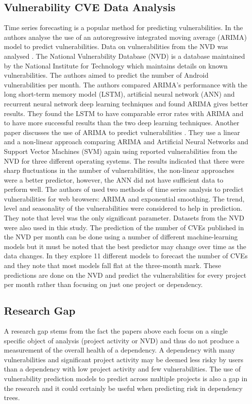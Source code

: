 \documentclass[conference]{IEEEtran}
\begin{document}
\subsection{Vulnerability CVE Data Analysis}
Time series forecasting is a popular method for predicting vulnerabilities. In \cite{gencer_time_2021} the authors analyse the use of an autoregressive integrated moving average (ARIMA) model to predict vulnerabilities. Data on vulnerabilities from the NVD was analysed \cite{noauthor_vulnerability_nodate}. The National Vulnerability Database (NVD) is a database maintained by the National Institute for Technology which maintains details on known vulnerabilities. The authors aimed to predict the number of Android vulnerabilities per month. The authors compared ARIMA's performance with the long short-term memory model (LSTM), artificial neural network (ANN) and recurrent neural network deep learning techniques and found ARIMA gives better results. They found the LSTM to have comparable error rates with ARIMA and to have more successful results than the two deep learning techniques. Another paper discusses the use of ARIMA to predict vulnerabilities \cite{pokhrel_cybersecurity_2017}. They use a linear and a non-linear approach comparing ARIMA and Artificial Neural Networks and Support Vector Machines (SVM) again using reported vulnerabilities from the NVD for three different operating systems. The results indicated that there were sharp fluctuations in the number of vulnerabilities, the non-linear approaches were a better predictor, however, the ANN did not have sufficient data to perform well. The authors of \cite{roumani_time_2015} used two methods of time series analysis to predict vulnerabilities for web browsers: ARIMA and exponential smoothing. The trend, level and seasonality of the vulnerabilities were considered to help in prediction. They note that level was the only significant parameter. Datasets from the NVD were also used in this study. The prediction of the number of CVEs published in the NVD per month can be done using a number of different machine-learning models but it must be noted that the best predictor may change over time as the data changes. In \cite{leverett_vulnerability_2021} they explore 11 different models to forecast the number of CVEs and they note that most models fall flat at the three-month mark. These predictions are done on the NVD and predict the vulnerabilities for every project per month rather than focusing on just one project or dependency. 

\subsection{Research Gap}
A research gap stems from the fact the papers above each focus on a single specific object of analysis (project activity or NVD) and thus do not produce a measurement of the overall health of a dependency. A dependency with many vulnerabilities and significant project activity may be deemed less risky by users than a dependency with low project activity and few vulnerabilities. The use of vulnerability prediction models to predict across multiple projects is also a gap in the research and it could certainly be useful when predicting risk in dependency trees. 
\end{document}
